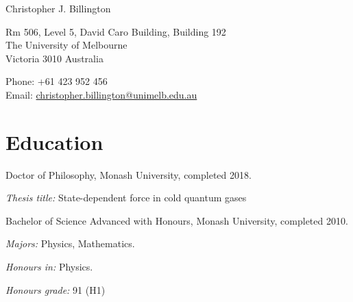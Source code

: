 \documentclass[10pt,a4paper]{article}
\def\name{Christopher J. Billington}
\renewenvironment{itemize}{
  \begin{list}{}{
    \setlength{\leftmargin}{1.5em}
    \setlength{\itemsep}{0.25em}
    \setlength{\parskip}{0pt}
    \setlength{\parsep}{0.25em}
  }
}{
  \end{list}
}
\begin{document}
{\huge \name}

\bigskip

\begin{minipage}[t]{0.5\textwidth}
  Rm 506, Level 5, David Caro Building, Building 192 \\
  The University of Melbourne \\
  Victoria 3010 Australia \\
\end{minipage}
\begin{minipage}[t]{0.5\textwidth}
  Phone: +61 423 952 456 \\
  Email: \href{mailto:christopher.billington@unimelb.edu.au}{christopher.billington@unimelb.edu.au} \\
\end{minipage}

\section*{Education}

\begin{itemize}

  \item Doctor of Philosophy, Monash University, completed 2018.
    \begin{itemize}
    \item \textit{Thesis title:}
      State-dependent force in cold quantum gases
    \end{itemize}
    
  \item Bachelor of Science Advanced with Honours, Monash University, completed 2010.
    \begin{itemize}
    \item \textit{Majors:}
      Physics, Mathematics.
    \item \textit{Honours in:}
      Physics.
    \item \textit{Honours grade:} 91 (\textsc{H}1)
    \end{itemize}
    
  
\end{itemize}
\end{document}
